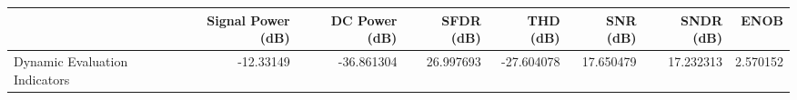 \begin{tabular}{lrrrrrrr}
\toprule
{} &  Signal Power (dB) &  DC Power (dB) &  SFDR (dB) &   THD (dB) &   SNR (dB) &  SNDR (dB) &      ENOB \\
\midrule
Dynamic Evaluation Indicators &          -12.33149 &     -36.861304 &  26.997693 & -27.604078 &  17.650479 &  17.232313 &  2.570152 \\
\bottomrule
\end{tabular}
